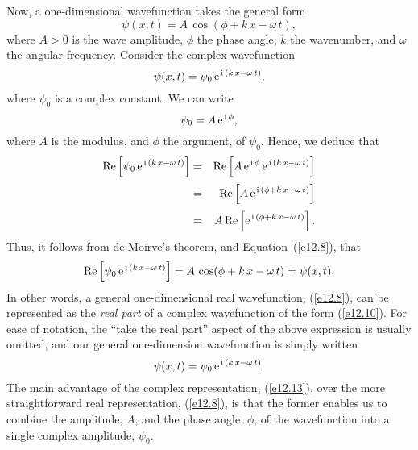 Now, a  one-dimensional wavefunction takes the general form
\begin{equation}\label{e12.8}
\psi(x,t) = A\,\cos(\phi+k\,x-\omega\,t),
\end{equation}
where $A>0$ is the wave amplitude, $\phi$ the phase angle, $k$ the wavenumber, and $\omega$ the angular
frequency.  Consider the complex wavefunction
\begin{equation}\label{e12.10}
\psi(x,t) = \psi_0\,{\rm e}^{\,{\rm i}\,(k\,x-\omega\,t)},
\end{equation}
where $\psi_0$ is a complex constant. We can write
\begin{equation}
\psi_0 = A\,{\rm e}^{\,{\rm i}\,\phi},
\end{equation}
where $A$ is the modulus, and $\phi$ the argument, of $\psi_0$.
Hence, we deduce that
\begin{eqnarray}
{\rm Re}\left[\psi_0\,{\rm e}^{\,{\rm i}\,(k\,x-\omega\,t)}\right] &=& {\rm Re}\left[A\,{\rm e}^{\,{\rm i}\,\phi}\,{\rm e}^{\,{\rm i}\,(k\,x-\omega\,t)}\right]\nonumber\\[0.5ex]
&=&{\rm Re}\left[A\,{\rm e}^{\,{\rm i}\,(\phi+k\,x-\omega\,t)}\right]\nonumber\\[0.5ex]&=&A\,{\rm Re}\left[{\rm e}^{\,{\rm i}\,(\phi+k\,x-\omega\,t)}\right].
\end{eqnarray}
Thus, it follows from de Moirve's theorem, and Equation~(\ref{e12.8}), that
\begin{equation}
{\rm Re}\left[\psi_0\,{\rm e}^{\,{\rm i}\,(k\,x-\omega\,t)}\right] =A\,\cos(\phi+k\,x-\omega\,t)=\psi(x,t).
\end{equation}
In other words, a  general one-dimensional real wavefunction, (\ref{e12.8}), can be
represented as the {\em real part}\/ of a complex wavefunction of the form (\ref{e12.10}).
For ease
of notation, the ``take the real part''  aspect of the above expression is usually omitted, and our general one-dimension wavefunction
is simply written
\begin{equation}\label{e12.13}
\psi(x,t) = \psi_0\,{\rm e}^{\,{\rm i}\,(k\,x-\omega\,t)}.
\end{equation}
 The
main advantage of the complex representation, (\ref{e12.13}), over the more straightforward
real representation, (\ref{e12.8}), is that the former enables us to combine the amplitude, $A$, and the
phase angle, $\phi$, of the wavefunction into a single complex amplitude, $\psi_0$. 

